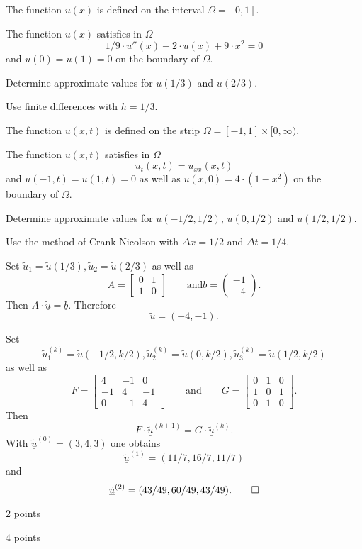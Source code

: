 \begin{teilaufgaben}
\item
{}
The function $u(x)$ is defined on the interval $\Omega = [0,1].$ 

The function $u(x)$ satisfies in $\Omega$ 
\[
1/9 \cdot u''(x) + 2 \cdot u(x) + 9 \cdot x^2 = 0
\]
and  $u(0) = u(1) = 0$ on the boundary of $\Omega$. 

Determine approximate values for $u(1/3)$ and $u(2/3)$. 

Use finite differences with $h = 1/3$. 

\item
{}
The function $u(x,t)$ is defined on the strip
$\Omega = [-1, 1] \times [0,\infty)$.

The function $u(x,t)$ satisfies in $\Omega$
\[
u_{t}(x,t) = u_{xx}(x,t)
\]
and $u(-1,t) = u(1,t) = 0$ as well as $u(x,0) = 4 \cdot (1-x^2)$
on the boundary of $\Omega$.

Determine approximate values for $u(-1/2,1/2)$, $u(0,1/2)$ and $u(1/2,1/2)$. 

Use the method of Crank-Nicolson with $\Delta x = 1/2$ and $\Delta t = 1/4.$
\end{teilaufgaben}

\begin{loesung}
\begin{teilaufgaben}
\item
Set $\tilde u_1 = \tilde u(1/3), \tilde u_2 = \tilde u(2/3)$ as well as
\[
A
=
\left[\begin{array}{rr} 0 & 1  \\ 1 & 0  \end{array}\right]
\qquad \text{and}
\underline{b}
=
\left(\begin{array}{r} -1 \\ -4 \end{array}\right).
\]
Then $A \cdot \underline{\tilde u} = \underline{b}$.
Therefore
\[
\underline{\tilde u} = (-4,-1).
\]

\item
Set
\[
\tilde u_1^{(k)}
=
\tilde u(-1/2,k/2), \tilde u_2^{(k)}
=
\tilde u(0,k/2), \tilde u_3^{(k)}
=
\tilde u(1/2,k/2)
\]
as well as
\[
F
=
\left[\begin{array}{rrr} 4 & - 1 & 0 \\ -1 & 4 & -1 \\ 0 & -1 & 4 \end{array}\right]
\qquad
\text{and}\qquad
G
=
\left[\begin{array}{rrr} 0 & 1 & 0  \\ 1 & 0 & 1 \\ 0 & 1 & 0 \end{array}\right].
\]
Then
\[
F \cdot \underline{\tilde u}^{(k+1)}
=
G \cdot \underline{\tilde u}^{(k)}.
\]
With $\underline{\tilde u}^{(0)} = (3,4,3)$ one obtains
\[
\underline{\tilde u}^{(1)}
=
(11/7,16/7,11/7)
\]
and
\[
\underline{\tilde u}^{(2)}
=
(43/49,60/49, 43/49).
\qedhere
\]
\end{teilaufgaben}
\end{loesung}

\begin{bewertung}
\begin{teilaufgaben}
\item 2 points
\item 4 points
\end{teilaufgaben}
\end{bewertung}
